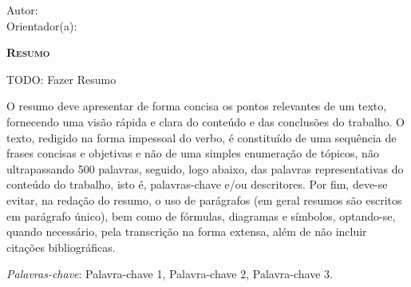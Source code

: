 \begin{center}
	{\Large{\textbf{\thesistitle}}}
\end{center}

\vspace{1cm}

\begin{flushright}
	Autor: \thesisauthor\\
	Orientador(a): \thesissupervisor
\end{flushright}

\vspace{1cm}

\begin{center}
	\Large{\textsc{\textbf{Resumo}}}
\end{center}

TODO: Fazer Resumo

\noindent O resumo deve apresentar de forma concisa os pontos relevantes de um
texto, fornecendo uma visão rápida e clara do conteúdo e das conclusões do
trabalho. O texto, redigido na forma impessoal do verbo, é constituído de uma
sequência de frases concisas e objetivas e não de uma simples enumeração de
tópicos, não ultrapassando 500 palavras, seguido, logo abaixo, das palavras
representativas do conteúdo do trabalho, isto é, palavras-chave e/ou
descritores. Por fim, deve-se evitar, na redação do resumo, o uso de parágrafos
(em geral resumos são escritos em parágrafo único), bem como de fórmulas,
diagramas e símbolos, optando-se, quando necessário, pela transcrição na forma
extensa, além de não incluir citações bibliográficas.

\noindent\textit{Palavras-chave}: Palavra-chave 1, Palavra-chave 2, Palavra-chave 3.